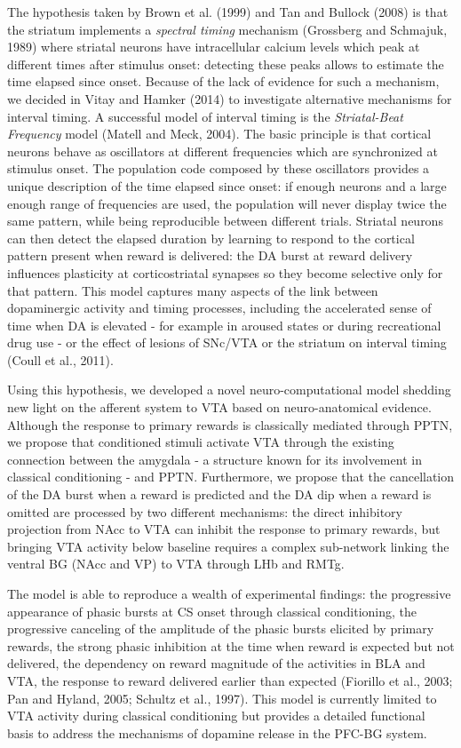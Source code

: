 \documentclass[
  11pt,
  a4paper,
]{scrbook}
\begin{document}
The hypothesis taken by Brown et al. (1999) and Tan and Bullock (2008)
is that the striatum implements a \emph{spectral timing} mechanism
(Grossberg and Schmajuk, 1989) where striatal neurons have intracellular
calcium levels which peak at different times after stimulus onset:
detecting these peaks allows to estimate the time elapsed since onset.
Because of the lack of evidence for such a mechanism, we decided in
Vitay and Hamker (2014) to investigate alternative mechanisms for
interval timing. A successful model of interval timing is the
\emph{Striatal-Beat Frequency} model (Matell and Meck, 2004). The basic
principle is that cortical neurons behave as oscillators at different
frequencies which are synchronized at stimulus onset. The population
code composed by these oscillators provides a unique description of the
time elapsed since onset: if enough neurons and a large enough range of
frequencies are used, the population will never display twice the same
pattern, while being reproducible between different trials. Striatal
neurons can then detect the elapsed duration by learning to respond to
the cortical pattern present when reward is delivered: the DA burst at
reward delivery influences plasticity at corticostriatal synapses so
they become selective only for that pattern. This model captures many
aspects of the link between dopaminergic activity and timing processes,
including the accelerated sense of time when DA is elevated - for
example in aroused states or during recreational drug use - or the
effect of lesions of SNc/VTA or the striatum on interval timing (Coull
et al., 2011).

Using this hypothesis, we developed a novel neuro-computational model
shedding new light on the afferent system to VTA based on
neuro-anatomical evidence. Although the response to primary rewards is
classically mediated through PPTN, we propose that conditioned stimuli
activate VTA through the existing connection between the amygdala - a
structure known for its involvement in classical conditioning - and
PPTN. Furthermore, we propose that the cancellation of the DA burst when
a reward is predicted and the DA dip when a reward is omitted are
processed by two different mechanisms: the direct inhibitory projection
from NAcc to VTA can inhibit the response to primary rewards, but
bringing VTA activity below baseline requires a complex sub-network
linking the ventral BG (NAcc and VP) to VTA through LHb and RMTg.

The model is able to reproduce a wealth of experimental findings: the
progressive appearance of phasic bursts at CS onset through classical
conditioning, the progressive canceling of the amplitude of the phasic
bursts elicited by primary rewards, the strong phasic inhibition at the
time when reward is expected but not delivered, the dependency on reward
magnitude of the activities in BLA and VTA, the response to reward
delivered earlier than expected (Fiorillo et al., 2003; Pan and Hyland,
2005; Schultz et al., 1997). This model is currently limited to VTA
activity during classical conditioning but provides a detailed
functional basis to address the mechanisms of dopamine release in the
PFC-BG system.
\end{document}

